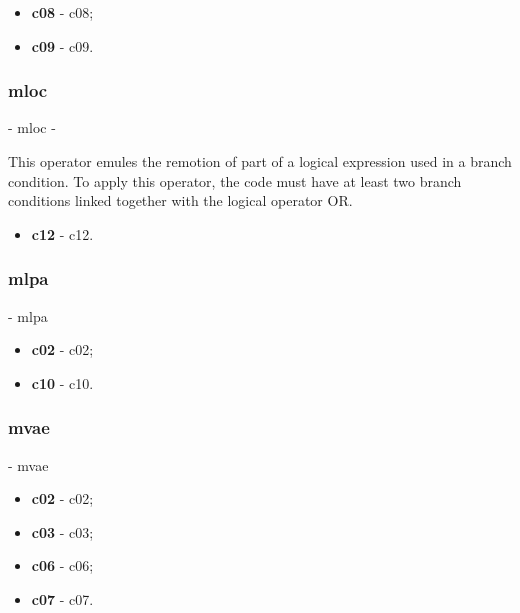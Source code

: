 	\begin{itemize}
		\item \textbf{\acs{c08}} - \Acl{c08};
		\item \textbf{\acs{c09}} - \Acl{c09}.
	\end{itemize}

	\hypertarget{mloc}{}
	\subsubsection{\textbf{\acs{mloc}}} - \Acl{mloc} - 

	This operator emules the remotion of part of a logical expression used in a branch condition. To apply this operator, the code must have at least two branch conditions linked together with the logical operator OR. 
	\begin{itemize}
		\item \textbf{\acs{c12}} - \Acl{c12}.
	\end{itemize}

	\hypertarget{mlpa}{}
	\subsubsection{\textbf{\acs{mlpa}}} - \Acl{mlpa}

	\begin{itemize}
		\item \textbf{\acs{c02}} - \Acl{c02};
		\item \textbf{\acs{c10}} - \Acl{c10}.
	\end{itemize}

	\hypertarget{mvae}{}
	\subsubsection{\textbf{\acs{mvae}}} - \Acl{mvae}

	\begin{itemize}
		\item \textbf{\acs{c02}} - \Acl{c02};
		\item \textbf{\acs{c03}} - \Acl{c03};
		\item \textbf{\acs{c06}} - \Acl{c06};
		\item \textbf{\acs{c07}} - \Acl{c07}.
	\end{itemize}

